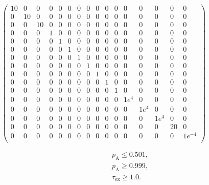 \documentclass[a4paper,11pt,twoside,openright]{book}
\def\lthtmlcheckvsize{\ifdim\ht\sizebox<\vsize 
  \ifdim\wd\sizebox<\hsize\expandafter\hfill\fi \expandafter\vfill
  \else\expandafter\vss\fi}%
\begin{document}
{\newpage\clearpage
{}%
$\displaystyle \begin{pmatrix}
10 & 0  & 0  & 0 & 0 & 0 & 0 & 0 & 0 & 0 & 0 & 0    & 0    & 0    & 0    & 0       \\
0  & 10 & 0  & 0 & 0 & 0 & 0 & 0 & 0 & 0 & 0 & 0    & 0    & 0    & 0    & 0       \\
0  & 0  & 10 & 0 & 0 & 0 & 0 & 0 & 0 & 0 & 0 & 0    & 0    & 0    & 0    & 0       \\
0  & 0  & 0  & 1 & 0 & 0 & 0 & 0 & 0 & 0 & 0 & 0    & 0    & 0    & 0    & 0       \\
0  & 0  & 0  & 0 & 1 & 0 & 0 & 0 & 0 & 0 & 0 & 0    & 0    & 0    & 0    & 0       \\
0  & 0  & 0  & 0 & 0 & 1 & 0 & 0 & 0 & 0 & 0 & 0    & 0    & 0    & 0    & 0       \\
0  & 0  & 0  & 0 & 0 & 0 & 1 & 0 & 0 & 0 & 0 & 0    & 0    & 0    & 0    & 0       \\
0  & 0  & 0  & 0 & 0 & 0 & 0 & 1 & 0 & 0 & 0 & 0    & 0    & 0    & 0    & 0       \\
0  & 0  & 0  & 0 & 0 & 0 & 0 & 0 & 1 & 0 & 0 & 0    & 0    & 0    & 0    & 0       \\
0  & 0  & 0  & 0 & 0 & 0 & 0 & 0 & 0 & 1 & 0 & 0    & 0    & 0    & 0    & 0       \\
0  & 0  & 0  & 0 & 0 & 0 & 0 & 0 & 0 & 0 & 1 & 0    & 0    & 0    & 0    & 0       \\
0  & 0  & 0  & 0 & 0 & 0 & 0 & 0 & 0 & 0 & 0 & 1e^4 & 0    & 0    & 0    & 0       \\
0  & 0  & 0  & 0 & 0 & 0 & 0 & 0 & 0 & 0 & 0 & 0    & 1e^4 & 0    & 0    & 0       \\
0  & 0  & 0  & 0 & 0 & 0 & 0 & 0 & 0 & 0 & 0 & 0    & 0    & 1e^4 & 0    & 0       \\
0  & 0  & 0  & 0 & 0 & 0 & 0 & 0 & 0 & 0 & 0 & 0    & 0    & 0    & 20   & 0       \\
0  & 0  & 0  & 0 & 0 & 0 & 0 & 0 & 0 & 0 & 0 & 0    & 0    & 0    & 0    & 1e^{-4} \\
\end{pmatrix}$%
\lthtmlindisplaymathZ
\lthtmlcheckvsize\clearpage}

{\newpage\clearpage
\setcounter{equation}{98}
%
\begin{subequations}\begin{gather}
p_{\textrm{A}}\leqslant 0.501, \\
p_{\textrm{A}}\geqslant 0.999, \\
\tau_{\textrm{ex}}\geqslant 1.0.
\end{gather}\end{subequations}%
\lthtmldisplayZ
\lthtmlcheckvsize\clearpage}
\end{document}
